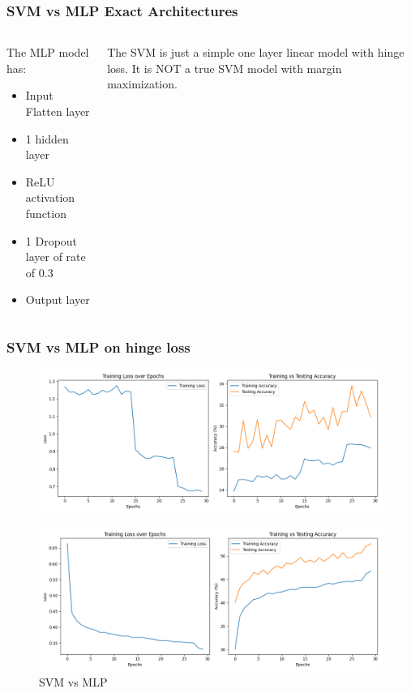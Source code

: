 \begin{frame}
    \frametitle{SVM vs MLP Exact Architectures}
    \begin{columns}
        \begin{column}{0.5\textwidth} 
            The MLP model has:
            \begin{itemize}
                \item Input Flatten layer
                \item 1 hidden layer
                \item ReLU activation function
                \item 1 Dropout layer of rate of 0.3
                \item Output layer 
            \end{itemize}
        \end{column}
        \begin{column}{0.5\textwidth} 
            The SVM is just a simple one layer linear model with hinge loss. It is NOT a true SVM 
            model with margin maximization.
        \end{column}
    \end{columns}
\end{frame}

\begin{frame}
    \frametitle{SVM vs MLP on hinge loss}
    \begin{figure}
        \centering
        \includegraphics[height=0.4\textheight]{media/2ndAssignment/svm.png}
    \end{figure}
    \vspace{-0.5cm}
    \begin{figure}
        \centering
        \includegraphics[height=0.4\textheight]{media/2ndAssignment/mlp.png}
        \vspace{-0.5cm}
        \caption{SVM vs MLP}
    \end{figure}
\end{frame}

